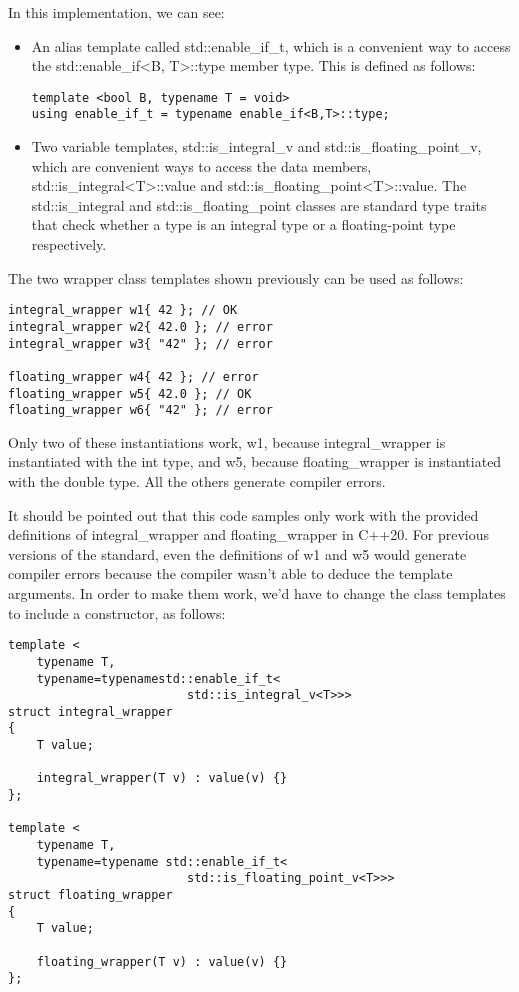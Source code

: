 In this implementation, we can see:

\begin{itemize}
\item
An alias template called std::enable\_if\_t, which is a convenient way to access the std::enable\_if<B, T>::type member type. This is defined as follows:

\begin{lstlisting}[style=styleCXX]
template <bool B, typename T = void>
using enable_if_t = typename enable_if<B,T>::type;
\end{lstlisting}

\item
Two variable templates, std::is\_integral\_v and std::is\_floating\_point\_v, which are convenient ways to access the data members, std::is\_integral<T>::value and std::is\_floating\_point<T>::value. The std::is\_integral and std::is\_floating\_point classes are standard type traits that check whether a type is an integral type or a floating-point type respectively.
\end{itemize}

The two wrapper class templates shown previously can be used as follows:

\begin{lstlisting}[style=styleCXX]
integral_wrapper w1{ 42 }; // OK
integral_wrapper w2{ 42.0 }; // error
integral_wrapper w3{ "42" }; // error

floating_wrapper w4{ 42 }; // error
floating_wrapper w5{ 42.0 }; // OK
floating_wrapper w6{ "42" }; // error
\end{lstlisting}

Only two of these instantiations work, w1, because integral\_wrapper is instantiated with the int type, and w5, because floating\_wrapper is instantiated with the double type. All the others generate compiler errors.

It should be pointed out that this code samples only work with the provided definitions of integral\_wrapper and floating\_wrapper in C++20. For previous versions of the standard, even the definitions of w1 and w5 would generate compiler errors because the compiler wasn’t able to deduce the template arguments. In order to make them work, we’d have to change the class templates to include a constructor, as follows:

\begin{lstlisting}[style=styleCXX]
template <
	typename T,
	typename=typenamestd::enable_if_t<
						 std::is_integral_v<T>>>
struct integral_wrapper
{
	T value;
	
	integral_wrapper(T v) : value(v) {}
};

template <
	typename T,
	typename=typename std::enable_if_t<
						 std::is_floating_point_v<T>>>
struct floating_wrapper
{
	T value;
	
	floating_wrapper(T v) : value(v) {}
};
\end{lstlisting}

